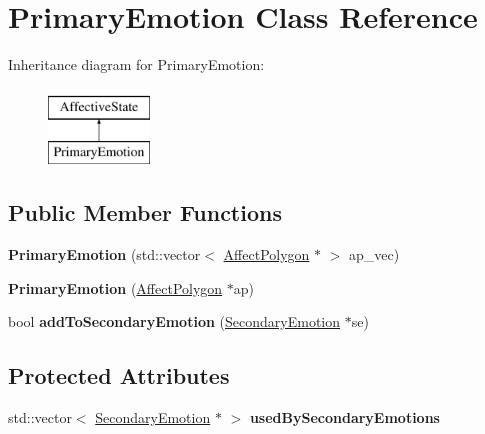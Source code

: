 \hypertarget{class_primary_emotion}{
\section{\-Primary\-Emotion \-Class \-Reference}
\label{class_primary_emotion}
}
\-Inheritance diagram for \-Primary\-Emotion\-:\begin{figure}[H]
\begin{center}
\leavevmode
\includegraphics[height=2.000000cm]{class_primary_emotion}
\end{center}
\end{figure}
\subsection*{\-Public \-Member \-Functions}
\begin{DoxyCompactItemize}
\item 
\hypertarget{class_primary_emotion_a1e27423637ba33eb1a1c8910cab29608}{
{\bfseries \-Primary\-Emotion} (std\-::vector$<$ \hyperlink{class_affect_polygon}{\-Affect\-Polygon} $\ast$ $>$ ap\-\_\-vec)}
\label{class_primary_emotion_a1e27423637ba33eb1a1c8910cab29608}

\item 
\hypertarget{class_primary_emotion_af804796c1d91c359a8ae1d4173a05011}{
{\bfseries \-Primary\-Emotion} (\hyperlink{class_affect_polygon}{\-Affect\-Polygon} $\ast$ap)}
\label{class_primary_emotion_af804796c1d91c359a8ae1d4173a05011}

\item 
\hypertarget{class_primary_emotion_a930ff9585427165598b3624c7732eb15}{
bool {\bfseries add\-To\-Secondary\-Emotion} (\hyperlink{class_secondary_emotion}{\-Secondary\-Emotion} $\ast$se)}
\label{class_primary_emotion_a930ff9585427165598b3624c7732eb15}

\end{DoxyCompactItemize}
\subsection*{\-Protected \-Attributes}
\begin{DoxyCompactItemize}
\item 
\hypertarget{class_primary_emotion_aa56575b1b520f26199ce41ce466218cd}{
std\-::vector$<$ \hyperlink{class_secondary_emotion}{\-Secondary\-Emotion} $\ast$ $>$ {\bfseries used\-By\-Secondary\-Emotions}}
\label{class_primary_emotion_aa56575b1b520f26199ce41ce466218cd}

\end{DoxyCompactItemize}


